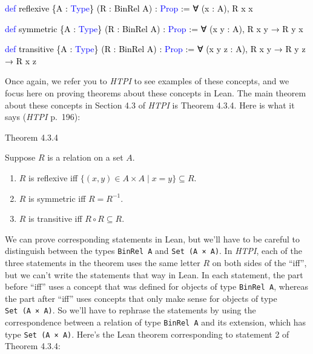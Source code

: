 \documentclass[
  letterpaper,
  DIV=11,
  numbers=noendperiod]{scrreprt}
\newenvironment{Shaded}{\begin{snugshade}}{\end{snugshade}}
\newcommand{\KeywordTok}[1]{\textcolor[rgb]{0.00,0.23,0.31}{#1}}
\newcommand{\NormalTok}[1]{\textcolor[rgb]{0.00,0.23,0.31}{#1}}
\providecommand{\tightlist}{%
  \setlength{\itemsep}{0pt}\setlength{\parskip}{0pt}}\usepackage{longtable,booktabs,array}
\renewcommand{\NormalTok}[1]{\textcolor[HTML]{000000}{#1}}
\renewcommand{\KeywordTok}[1]{\textcolor[HTML]{0000FF}{#1}}
\theoremstyle{remark}
\begin{document}
\begin{Shaded}
\begin{Highlighting}[]
\KeywordTok{def}\NormalTok{ reflexive \{A : }\KeywordTok{Type}\NormalTok{\} (R : BinRel A) : }\KeywordTok{Prop}\NormalTok{ :=}
\NormalTok{  ∀ (x : A), R x x}

\KeywordTok{def}\NormalTok{ symmetric \{A : }\KeywordTok{Type}\NormalTok{\} (R : BinRel A) : }\KeywordTok{Prop}\NormalTok{ :=}
\NormalTok{  ∀ (x y : A), R x y → R y x}

\KeywordTok{def}\NormalTok{ transitive \{A : }\KeywordTok{Type}\NormalTok{\} (R : BinRel A) : }\KeywordTok{Prop}\NormalTok{ :=}
\NormalTok{  ∀ (x y z : A), R x y → R y z → R x z}
\end{Highlighting}
\end{Shaded}

Once again, we refer you to \emph{HTPI} to see examples of these
concepts, and we focus here on proving theorems about these concepts in
Lean. The main theorem about these concepts in Section 4.3 of
\emph{HTPI} is Theorem 4.3.4. Here is what it says (\emph{HTPI} p.~196):

\begin{nthm}{Theorem 4.3.4}

Suppose \(R\) is a relation on a set \(A\).

\begin{enumerate}
\def\labelenumi{\arabic{enumi}.}
\tightlist
\item
  \(R\) is reflexive iff
  \(\{(x, y) \in A \times A \mid x = y\} \subseteq R\).
\item
  \(R\) is symmetric iff \(R = R^{-1}\).
\item
  \(R\) is transitive iff \(R \circ R \subseteq R\).
\end{enumerate}

\end{nthm}

We can prove corresponding statements in Lean, but we'll have to be
careful to distinguish between the types \texttt{BinRel\ A} and
\texttt{Set\ (A\ ×\ A)}. In \emph{HTPI}, each of the three statements in
the theorem uses the same letter \(R\) on both sides of the ``iff'', but
we can't write the statements that way in Lean. In each statement, the
part before ``iff'' uses a concept that was defined for objects of type
\texttt{BinRel\ A}, whereas the part after ``iff'' uses concepts that
only make sense for objects of type \texttt{Set\ (A\ ×\ A)}. So we'll
have to rephrase the statements by using the correspondence between a
relation of type \texttt{BinRel\ A} and its extension, which has type
\texttt{Set\ (A\ ×\ A)}. Here's the Lean theorem corresponding to
statement 2 of Theorem 4.3.4:
\end{document}
